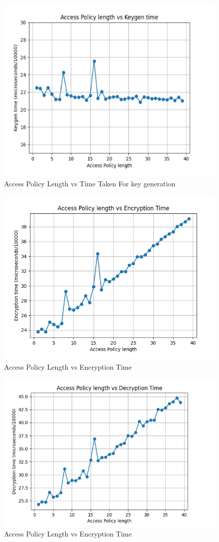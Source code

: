 \begin{figure}[h]
    \centering
    \includegraphics[width=0.75\linewidth]{Images/AccessPolicyLengthVsKeyGenTime.jpeg}
 
    \caption{Access Policy Length vs Time Taken For key generation }
    \label{fig:enter-label}
\end{figure}


\begin{figure}
    \centering
    \includegraphics[width=0.75\linewidth]{Images/AccessPolicyLengthVsEncryptionTime.jpeg}
    \caption{Access Policy Length vs Encryption Time }
    \label{fig:enter-label}
\end{figure}


\begin{figure}
    \centering
    \includegraphics[width=0.75\linewidth]{Images/AccessPolicyVsDecryptionTime.jpeg}
    \caption{Access Policy Length vs Encryption Time }
    \label{fig:enter-label}
\end{figure}


